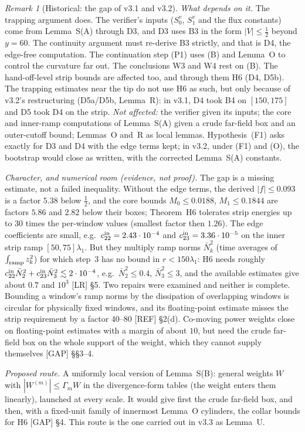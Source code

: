 \documentclass[11pt]{amsart}
\theoremstyle{definition}
\theoremstyle{remark}
\newtheorem{remark}[theorem]{Remark}
\newcommand{\dref}[1]{[\textsf{#1}]}
\begin{document}
\begin{remark}[Historical: the gap of v3.1 and v3.2]
\emph{What depends on it.} The trapping argument does. The verifier's inputs ($S_0^v$, $S_1^v$ and the flux constants) come from Lemma~S(A) through D3, and D3 uses B3 in the form $|V|\le\frac12$ beyond $y=60$. The continuity argument must re-derive B3 strictly, and that is D4, the edge-free computation. The continuation step (P1) uses (B) and Lemma~O to control the curvature far out. The conclusions W3 and W4 rest on (B). The hand-off-level strip bounds are affected too, and through them H6 (D4, D5b). The trapping estimates near the tip do not use H6 as such, but only because of v3.2's restructuring (D5a/D5b, Lemma~R): in v3.1, D4 took B4 on $[150,175]$ and D5 took D4 on the strip. \emph{Not affected:} the verifier given its inputs; the core and inner-ramp computations of Lemma~S(A) given a crude far-field box and an outer-cutoff bound; Lemmas~O and~R as local lemmas. Hypothesis~(F1) asks exactly for D3 and D4 with the edge terms kept; in v3.2, under (F1) and (O), the bootstrap would close as written, with the corrected Lemma~S(A) constants.

\emph{Character, and numerical room (evidence, not proof).} The gap is a missing estimate, not a failed inequality. Without the edge terms, the derived $|f|\le0.093$ is a factor $5.38$ below $\frac12$, and the core bounds $M_0\le0.0188$, $M_1\le0.1844$ are factors $5.86$ and $2.82$ below their boxes; Theorem~H6 tolerates strip energies up to $30$ times the per-window values (smallest factor then $1.26$). The edge coefficients are small, e.g.\ $c^{\rm in}_{22}=2.43\cdot10^{-4}$ and $c^{\rm in}_{23}=3.36\cdot10^{-5}$ on the inner strip ramp $[50,75]\lambda_1$. But they multiply ramp norms $\bar N_k^2$ (time averages of $\int_{\rm ramp}z_k^2$) for which step~3 has no bound in $r<150\lambda_1$: H6 needs roughly $c^{\rm in}_{22}\bar N_2^2+c^{\rm in}_{23}\bar N_3^2\lesssim2\cdot10^{-4}$, e.g.\ $\bar N_2^2\le0.4$, $\bar N_3^2\le3$, and the available estimates give about $0.7$ and $10^3$ \dref{LR} \S5. Two repairs were examined and neither is complete. Bounding a window's ramp norms by the dissipation of overlapping windows is circular for physically fixed windows, and its floating-point estimate misses the strip requirement by a factor 40--80 \dref{REF} \S2(d). Co-moving power weights close on floating-point estimates with a margin of about $10$, but need the crude far-field box on the whole support of the weight, which they cannot supply themselves \dref{GAP} \S\S3--4.

\emph{Proposed route.} A uniformly local version of Lemma~S(B): general weights $W$ with $|W^{(m)}|\le\Gamma_mW$ in the divergence-form tables (the weight enters them linearly), launched at every scale. It would give first the crude far-field box, and then, with a fixed-unit family of innermost Lemma~O cylinders, the collar bounds for H6 \dref{GAP} \S4. This route is the one carried out in v3.3 as Lemma~U.
\end{remark}
\end{document}
